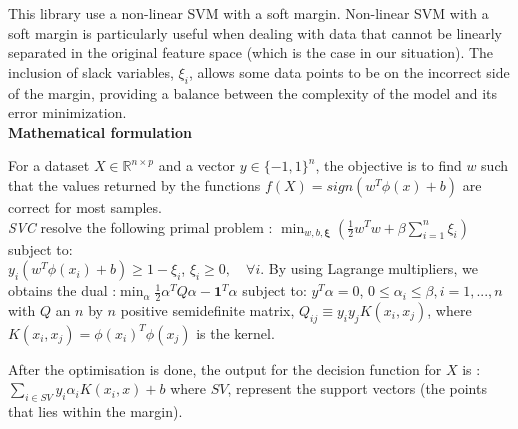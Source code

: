 \documentclass[twocolumn]{article}
\newcommand{\R}{\mathbb{R}}
\begin{document}
This library use a non-linear SVM with a soft margin. Non-linear SVM with a soft margin is particularly useful when dealing with data that cannot be linearly separated in the original feature space (which is the case in our situation). The inclusion of slack variables, \(\xi_i\), allows some data points to be on the incorrect side of the margin, providing a balance between the complexity of the model and its error minimization.\\

\textbf{Mathematical formulation}

For a dataset $X \in \R^{n \times p}$ and a vector $y \in \{-1, 1\}^n$, the objective is to find $w$ such that the values returned by the functions $f(X) = sign(w^T\phi(x) + b)$ are correct for most samples.\\
\textit{SVC} resolve the following primal problem : \(\displaystyle
\min_{w, b, \boldsymbol{\xi}} \left( \frac{1}{2} w^T w + \beta \sum_{i=1}^{n} \xi_i \right)
\) 
subject to:\\
\( y_i (w^T \phi(x_i) + b) \geq 1 - \xi_i\), \(\xi_i \geq 0, \quad \forall i\).
By using Lagrange multipliers, we obtains the dual :\(\displaystyle \min_{\alpha} \frac{1}{2} \alpha^T Q \alpha - \mathbf{1}^T \alpha
\) subject to: \(y^T \alpha = 0\), \(0 \leq \alpha_i \leq \beta, i=1,...,n\) with $Q$ an $n$ by $n$ positive semidefinite matrix, $Q_{ij} \equiv y_iy_jK(x_i, x_j)$, where $K(x_i, x_j) = \phi(x_i)^T\phi(x_j)$ is the kernel. 

After the optimisation is done, the output for the decision function for $X$ is :\(\displaystyle \sum_{i\in SV} y_i\alpha_i K(x_i, x) + b\)
where $SV$, represent the support vectors (the points that lies within the margin).
\end{document}
